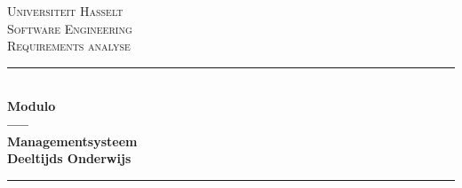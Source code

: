 \begin{titlepage}
\pagestyle{empty}
\newcommand{\HRule}{\rule{\linewidth}{0.5mm}} %

\center %
 

\textsc{\LARGE Universiteit Hasselt}\\[1.5cm] %
\textsc{\Large Software Engineering}\\[0.5cm] %
\textsc{\large Requirements analyse }\\[0.5cm] %


\HRule \\[0.4cm]
{ \huge \bfseries Modulo \\ \vspace{-0.4em} ----- \vspace{-0.4em}\\ Managementsysteem \\ Deeltijds Onderwijs }\\[0.2cm] %
\HRule \\[1.5cm]
 


\end{titlepage}
